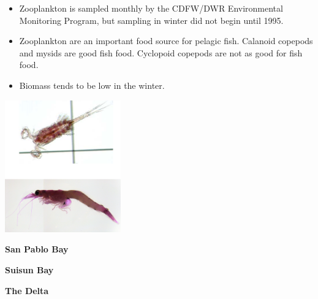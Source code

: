 \documentclass[]{article}\usepackage[]{graphicx}\usepackage[]{color}
\begin{document}
\begin{Row}
  \begin{Cell}{8}
    \begin{center}
      {\large 
        \begin{itemize}[leftmargin=2cm,rightmargin=2cm]
          \item Zooplankton is sampled monthly by the CDFW/DWR Environmental Monitoring 
          Program, but sampling in winter did not begin until 1995. 
          \item Zooplankton are an important food source for pelagic fish. Calanoid 
          copepods and mysids are good fish food. Cyclopoid copepods are not as good 
          for fish food.
          \item Biomass tends to be low in the winter.
        \end{itemize}
      }
    \end{center}
  \end{Cell}

  \begin{Cell}{2}
    \includegraphics[width=5cm,align=m]{figures/zoop/bug0.png}
  \end{Cell}
\end{Row}

\vspace{30pt}

\begin{Row}
  \begin{Cell}{4}
    \begin{center}
      {\Large {\bf San Pablo Bay}}
    \end{center}
  \end{Cell}
  \begin{Cell}{4}
    \begin{center}
      {\Large {\bf Suisun Bay}}
    \end{center}
  \end{Cell}
  \begin{Cell}{4}
    \begin{center}
      {\Large {\bf The Delta}}
    \end{center}
  \end{Cell}
  \begin{Cell}{3}
    \begin{center}
    \end{center}
  \end{Cell}  
\end{Row}
\end{document}
